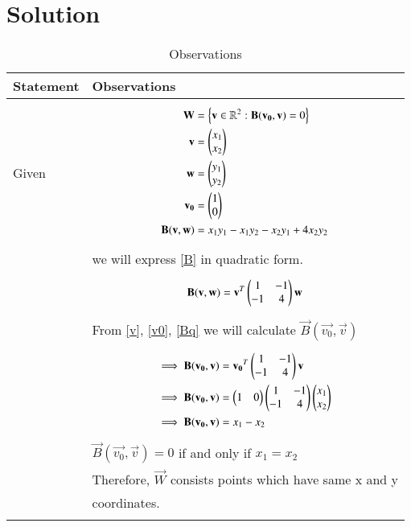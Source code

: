 \documentclass[journal,12pt]{IEEEtran}
\begin{document}
\section{\textbf{Solution}}
\renewcommand{\thetable}{2}
\begin{longtable}{|l|l|}
\hline
\endhead
\textbf{Statement}&\textbf{Observations}\\
\hline
Given&\parbox{10cm}{\begin{align}
    \mathbf{W}&=\left\{\mathbf{v}\in\mathbb{R}^2:\mathbf{B}(\mathbf{v_0},\mathbf{v})=0\right\}\label{W}\\
    \mathbf{v}&=\begin{pmatrix}x_1\\x_2\end{pmatrix}\label{v}\\
    \mathbf{w}&=\begin{pmatrix}y_1\\y_2\end{pmatrix}\label{w}\\
    \mathbf{v_0}&=\begin{pmatrix}1\\0\end{pmatrix}\label{v0}\\
    \mathbf{B}(\mathbf{v},\mathbf{w})&=x_1y_1-x_1y_2-x_2y_1+4x_2y_2\label{B}
\end{align}}\\&we will express \eqref{B} in quadratic form.\\&\parbox{10cm}{\begin{align}
    \mathbf{B}(\mathbf{v},\mathbf{w})=\mathbf{v}^T\begin{pmatrix}1&-1\\-1&4\end{pmatrix}\mathbf{w}\label{Bq}
\end{align}}\\&From \eqref{v}, \eqref{v0}, \eqref{Bq} we will calculate $\vec{B}(\vec{v_0},\vec{v})$\\&\parbox{10cm}{\begin{align}
    \implies\mathbf{B}(\mathbf{v_0},\mathbf{v})&=\mathbf{v_0}^T\begin{pmatrix}1&-1\\-1&4\end{pmatrix}\mathbf{v}\\
    \implies\mathbf{B}(\mathbf{v_0},\mathbf{v})&=\begin{pmatrix}1&0\end{pmatrix}\begin{pmatrix}1&-1\\-1&4\end{pmatrix}\begin{pmatrix}x_1\\x_2\end{pmatrix}\\
    \implies\mathbf{B}(\mathbf{v_0},\mathbf{v})&=x_1-x_2\label{Bv0}
\end{align}}\\&$\vec{B}(\vec{v_0},\vec{v})=0$ if and only if $x_1=x_2$\\&Therefore, $\vec{W}$ consists points which have same x and y\\&coordinates.\\
\hline
\caption{Observations}
\label{obs}
\end{longtable}
\renewcommand{\thetable}{3}
\end{document}
